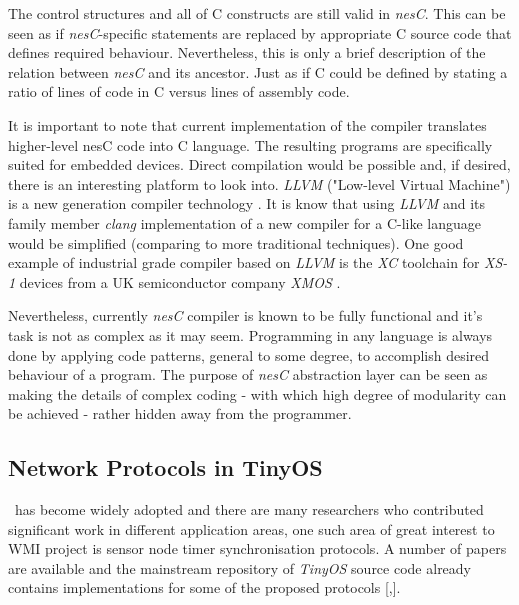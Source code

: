   The control structures and all of C constructs are still valid in
 \emph{nesC}. This can be seen as if \emph{nesC}-specific statements
 are replaced by appropriate C source code that defines required behaviour.
 Nevertheless, this is only a brief description of the relation between
 \emph{nesC} and its ancestor. Just as if C could be defined by stating
 a ratio of lines of code in C versus lines of assembly code.

 It is important to note that current implementation of the compiler
 translates higher-level nesC code into C language. The resulting
 programs are specifically suited for embedded devices. Direct
 compilation would be possible and, if desired, there is an interesting
 platform to look into. \emph{LLVM} ("Low-level Virtual Machine") is a
 new generation compiler technology \cite{links:wiki:llvm}. It is know
 that using \emph{LLVM} and its family member \emph{clang} implementation
 of a new compiler for a C-like language would be simplified (comparing
 to more traditional techniques). One good example of industrial grade
 compiler based on \emph{LLVM} is the \emph{XC} toolchain for \emph{XS-1}
 devices from a UK semiconductor company \emph{XMOS} \cite{links:xmos:tools}.

 Nevertheless, currently \emph{nesC} compiler is known to be fully
 functional and it's task is not as complex as it may seem. Programming
 in any language is always done by applying code patterns, general
 to some degree, to accomplish desired behaviour of a program.
 The purpose of \emph{nesC} abstraction layer can be seen as making
 the details of complex coding - with which high degree of modularity
 can be achieved - rather hidden away from the programmer.


\subsection{Network Protocols in TinyOS}
 
  \TinyOS\ has become widely adopted and there are many researchers
 who contributed significant work in different application areas, one
 such area of great interest to WMI project is sensor node timer
 synchronisation protocols. A number of papers are available \cite{
 Lenzen2010Clock, Lenzen2009Optimal, Sommer2009Gradient, Sommer2008Symmetric}
 and the mainstream repository of \emph{TinyOS} source code already contains
 implementations for some of the proposed protocols [,].

